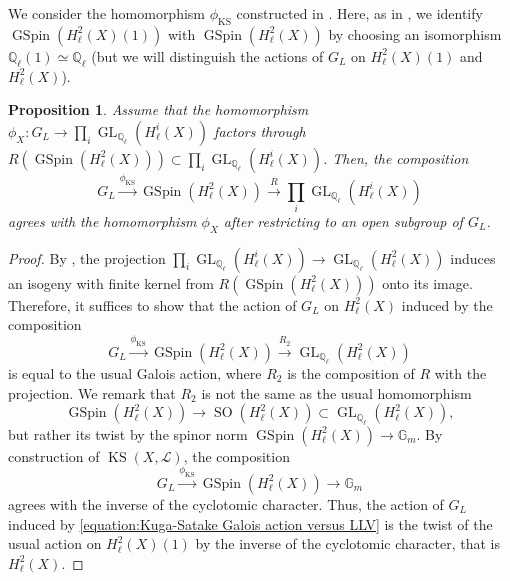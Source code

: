 \documentclass[12pt,reqno]{amsart}
\newtheorem{prop}[thm]{Proposition}
\theoremstyle{definition}
\newcommand{\G}{{\mathds G}}
\newcommand{\Q}{{\mathds Q}}
\newcommand\GL{\mathop{\mathrm{GL}}\nolimits}
\newcommand\GSpin{\mathop{\mathrm{GSpin}}\nolimits}
\newcommand\SO{\mathop{\mathrm{SO}}\nolimits}
\newcommand\KS{\mathop{\mathrm{KS}}\nolimits}
\newcommand{\scrL}{\mathscr{L}}
\numberwithin{equation}{section}
\begin{document}
We consider the homomorphism $\phi_{\KS}$
constructed in .
Here,
as in , we identify $\GSpin(H^2_{\ell}(X)(1))$ with $\GSpin(H^2_{\ell}(X))$
by choosing an isomorphism $\Q_\ell(1) \simeq \Q_\ell$
(but we will distinguish the actions of $G_L$ on $H^2_{\ell}(X)(1)$ and $H^2_{\ell}(X)$).

\begin{prop}\label{Proposition:LLV and Kuga-Satake}
    Assume that the homomorphism $\phi_X \colon G_L \to \prod_i \GL_{\Q_\ell}(H^i_\ell(X))$ factors through $R(\GSpin(H^2_\ell(X))) \subset \prod_i \GL_{\Q_\ell}(H^i_\ell(X))$.
    Then, the composition
\[
G_L \xrightarrow{\phi_{\KS}} \GSpin(H^2_{\ell}(X)) 
\xrightarrow{R}  \prod_i\GL_{\Q_\ell}(H^i_\ell(X))
\]
agrees with the homomorphism $\phi_X$ after restricting to an open subgroup of $G_L$.
\end{prop}

\begin{proof}
By \cite[Lemma 6.5]{FFZ},
    the projection
    $\prod_i \GL_{\Q_\ell}(H^i_\ell(X)) \to \GL_{\Q_\ell}(H^2_\ell(X))$
    induces an isogeny with finite kernel from
    $R(\GSpin(H^2_{\ell}(X)))$
    onto its image.
    Therefore, it suffices to show that
    the action of $G_L$ on $H^2_\ell(X)$ induced by the composition
    \begin{equation}\label{equation:Kuga-Satake Galois action versus LLV}
G_L\xrightarrow{\phi_{\KS}} \GSpin(H^2_{\ell}(X)) \xrightarrow{R_2} \GL_{\Q_\ell}(H^2_\ell(X))
\end{equation}
is equal to the usual Galois action,
where $R_2$ is the composition of $R$ with the projection.
We remark that 
$R_2$ is not the same as the usual homomorphism
\[
\GSpin(H^2_{\ell}(X)) \to \SO(H^2_\ell(X)) \subset \GL_{\Q_\ell}(H^2_\ell(X)),
\]
but rather its twist by the spinor norm $\GSpin(H^2_{\ell}(X)) \to \G_m$.
By construction of 
$\KS(X,\scrL)$,
the composition
\[
G_L\xrightarrow{\phi_{\KS}} \GSpin(H^2_{\ell}(X)) \to \G_m
\]
agrees with the inverse of the cyclotomic character.
Thus, the action of $G_L$ induced by \eqref{equation:Kuga-Satake Galois action versus LLV} is the twist of the usual action on $H^2_{\ell}(X)(1)$ by the inverse of the cyclotomic character, that is $H^2_{\ell}(X)$.
\end{proof}
\end{document}
